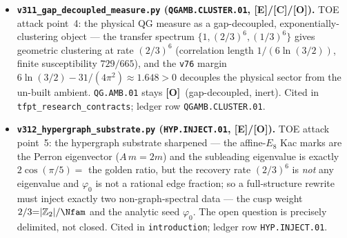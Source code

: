 \documentclass[11pt]{article}
\providecommand{\mE}{\textbf{[E]}}\providecommand{\mC}{\textbf{[C]}}
\providecommand{\mO}{\textbf{[O]}}\providecommand{\mX}{\textbf{[X]}}
\begin{document}
\begin{itemize}
  pins the RG. Closes the spectrum/anomaly/$\beta$ sub-question; the interacting Epstein--Glaser $S$-matrix and the
  Yukawa sector stay \mC/\mO. Cited in \texttt{tfpt\_research\_contracts}; ledger row \texttt{CAR.SM.ANOM.01}.
\item \textbf{\texttt{v311\_gap\_decoupled\_measure.py} (\texttt{QGAMB.CLUSTER.01}, \mE/\mC/\mO).} TOE attack point~4:
  the physical QG measure as a gap-decoupled, exponentially-clustering object --- the transfer spectrum
  $\{1,(2/3)^6,(1/3)^6\}$ gives geometric clustering at rate $(2/3)^6$ (correlation length $1/(6\ln(3/2))$, finite
  susceptibility $729/665$), and the \texttt{v76} margin $6\ln(3/2)-31/(4\pi^2){\approx}1.648{>}0$ decouples the
  physical sector from the un-built ambient. \texttt{QG.AMB.01} stays \mO\ (gap-decoupled, inert). Cited in
  \texttt{tfpt\_research\_contracts}; ledger row \texttt{QGAMB.CLUSTER.01}.
\item \textbf{\texttt{v312\_hypergraph\_substrate.py} (\texttt{HYP.INJECT.01}, \mE/\mO).} TOE attack point~5: the
  hypergraph substrate sharpened --- the affine-$E_8$ Kac marks are the Perron eigenvector ($A\,m{=}2m$) and the
  subleading eigenvalue is exactly $2\cos(\pi/5)=$ the golden ratio, but the recovery rate $(2/3)^6$ is \emph{not}
  any eigenvalue and $\varphi_0$ is not a rational edge fraction; so a full-structure rewrite must inject exactly two
  non-graph-spectral data --- the cusp weight $2/3{=}|\mathbb Z_2|/\Nfam$ and the analytic seed $\varphi_0$. The open
  question is precisely delimited, not closed. Cited in \texttt{introduction}; ledger row \texttt{HYP.INJECT.01}.
\end{itemize}
\end{document}
